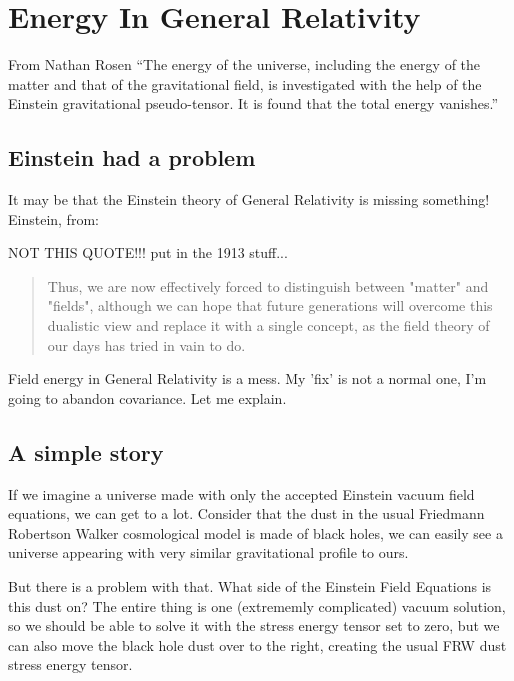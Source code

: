 \documentclass[../rzero]{subfiles}
\begin{document}
\chapter{Energy In General Relativity}\label{energyGeneralRelativityChapter}

\begin{chapquote}{From Nathan Rosen\cite{rosenEnergyUniverse1994}}
``The energy of the universe, including the energy of the matter and that of the gravitational field, is investigated with the help of the Einstein gravitational pseudo-tensor. It is found that the total energy vanishes.''
\end{chapquote}


\section{Einstein had a problem}
It may be that the Einstein theory of General Relativity is missing something! Einstein, from:\cite{08092323EnergyMomentumGravitational} 

NOT THIS QUOTE!!! put in the 1913 stuff...
\begin{quotation} 
	Thus, we are now effectively forced to distinguish between "matter" and "fields", although we can hope that future generations will overcome this dualistic view and replace it with a single concept, as the field theory of our days has tried in vain to do. 
\end{quotation}


Field energy in General Relativity is a mess. My 'fix' is not a normal one, I'm going to abandon covariance. Let me explain.

\section{A simple story}
If we imagine a universe made with only the accepted Einstein vacuum field equations, we can get to a lot. Consider that the dust in the usual Friedmann Robertson Walker\cite{GET REF} cosmological model is made of black holes, we can easily see a universe appearing with very similar gravitational profile to ours. 

But there is a problem with that. What side of the Einstein Field Equations is this dust on? The entire thing is one (extrememly complicated) vacuum solution, so we should be able to solve it with the stress energy tensor set to zero, but we can also move the black hole dust over to the right, creating the usual FRW dust stress energy tensor. 
\end{document}
